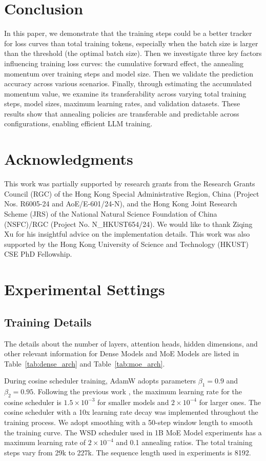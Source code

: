 \documentclass[letterpaper]{article} %
\begin{document}
\section{Conclusion}
In this paper, we demonstrate that the training steps could be a better tracker for loss curves than total training tokens, especially when the batch size is larger than the threshold (the optimal batch size). Then we investigate three key factors influencing training loss curves: the cumulative forward effect, the annealing momentum over training steps and model size. Then we validate the prediction accuracy across various scenarios. Finally, through estimating the accumulated momentum value, we examine its transferability across varying total training steps, model sizes, maximum learning rates, and validation datasets. These results show that annealing policies are transferable and predictable across configurations, enabling efficient LLM training.


\section*{Acknowledgments}
This work was partially supported by research grants from the Research Grants Council (RGC) of the Hong Kong Special Administrative Region, China (Project Nos. R6005-24 and AoE/E-601/24-N), and the Hong Kong Joint Research Scheme (JRS) of the National Natural Science Foundation of China (NSFC)/RGC (Project No. N\_HKUST654/24). We would like to thank Ziqing Xu for his insightful advice on the implementation details. This work was also supported by the Hong Kong University of Science and Technology (HKUST) CSE PhD Fellowship.




\appendix

\section{Experimental Settings}
\subsection{Training Details}
\label{subsect:Experimental_Settings}
The details about the number of layers, attention heads, hidden dimensions, and other relevant information for Dense Models and MoE Models are listed in Table~\ref{tab:dense_arch} and Table~\ref{tab:moe_arch}.

During cosine scheduler \citep{loshchilov2017sgdrstochasticgradientdescent} training, AdamW adopts parameters \(\beta_1 = 0.9\) and \(\beta_2 = 0.95\). Following the previous work \cite{Hoffmann2022TrainingCL}, the maximum learning rate for the cosine scheduler is \(1.5 \times 10^{-3}\) for smaller models and \(2 \times 10^{-4}\) for larger ones. The cosine scheduler with a 10x learning rate decay was implemented throughout the training process. We adopt smoothing with a 50-step window length to smooth the training curve. The WSD scheduler used in 1B MoE Model experiments has a maximum learning rate of \(2 \times 10^{-4}\) and 0.1 annealing ratios. The total training steps vary from 29k to 227k. The sequence length used in experiments is 8192.
\end{document}
